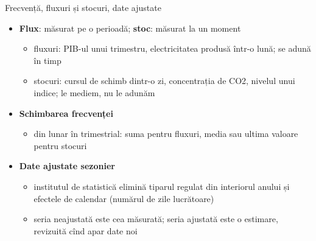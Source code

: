 \begin{frame}{Frecvență, fluxuri și stocuri, date ajustate}
\itemsize{\small}
\begin{itemize}
    \item \textbf{Flux}: măsurat pe o perioadă; \textbf{stoc}: măsurat la un moment
    \begin{itemize}
        \item fluxuri: PIB-ul unui trimestru, electricitatea produsă într-o lună; se adună în timp
        \item stocuri: cursul de schimb dintr-o zi, concentrația de CO2, nivelul unui indice; le mediem, nu le adunăm
    \end{itemize}
    \item \textbf{Schimbarea frecvenței}
    \begin{itemize}
        \item din lunar în trimestrial: suma pentru fluxuri, media sau ultima valoare pentru stocuri
    \end{itemize}
    \item \textbf{Date ajustate sezonier}
    \begin{itemize}
        \item institutul de statistică elimină tiparul regulat din interiorul anului și efectele de calendar (numărul de zile lucrătoare)
        \item seria neajustată este cea măsurată; seria ajustată este o estimare, revizuită cînd apar date noi
    \end{itemize}
\end{itemize}
\end{frame}

